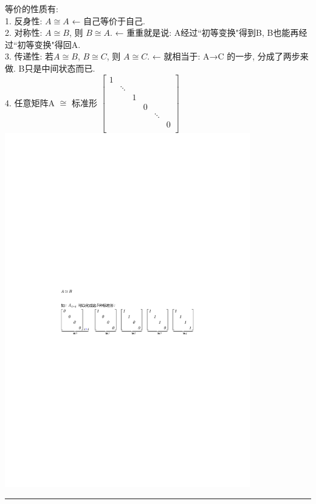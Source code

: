 \documentclass[UTF8]{ctexart}
\begin{document}
等价的性质有: \\
1. 反身性: $A\cong A$  ← 自己等价于自己. \\
2. 对称性: $A\cong B$, 则 $B\cong A$. ← 重重就是说: A经过``初等变换"得到B, B也能再经过``初等变换"得回A. \\
3. 传递性: 若$A\cong B$, $B\cong C$, 则 $A\cong C$. ← 就相当于: A→C 的一步, 分成了两步来做. B只是中间状态而已. \\
4. 任意矩阵A $\cong $ 标准形 $\left[ \begin{matrix}
	1&		&		&		&		&		\\
	&		\ddots&		&		&		&		\\
	&		&		1&		&		&		\\
	&		&		&		0&		&		\\
	&		&		&		&		\ddots&		\\
	&		&		&		&		&		0\\
\end{matrix} \right] 
$ \\

\includegraphics[width=0.8\textwidth]{img/0034.pdf}\\


\hrule
\end{document}
